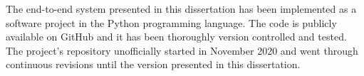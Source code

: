 
The end-to-end system presented in this dissertation has
been implemented as a software project in the Python
programming language. The code is publicly available on
GitHub and it has been thoroughly version controlled and
tested. The project's repository unofficially started in
November 2020 and went through continuous revisions until the version presented in this dissertation.
